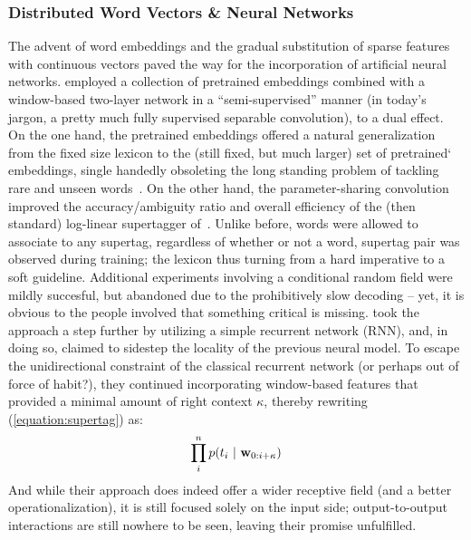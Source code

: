 \subsubsection{Distributed Word Vectors \& Neural Networks}
The advent of word embeddings and the gradual substitution of sparse features with continuous vectors paved the way for the incorporation of artificial neural networks.
\citet{10.1162/tacl_a_00186} employed a collection of pretrained embeddings combined with a window-based two-layer network in a ``semi-supervised'' manner (in today's jargon, a pretty much fully supervised separable convolution), to a dual effect.
On the one hand, the pretrained embeddings offered a natural generalization from the fixed size lexicon to the (still fixed, but much larger) set of pretrained` embeddings, single handedly obsoleting the long standing problem of tackling rare and unseen words~\cite{thomforde-steedman-2011-semi,deoskar-etal-2011-learning,deoskar2014generalizing}.
On the other hand, the parameter-sharing convolution improved the accuracy/ambiguity ratio and overall efficiency of the (then standard) log-linear supertagger of~\citet{clark2007wide}.
Unlike before, words were allowed to associate to any supertag, regardless of whether or not a \textlangle word, supertag\textrangle{} pair was observed during training; the lexicon thus turning from a hard imperative to a soft guideline.
Additional experiments involving a conditional random field were mildly succesful, but abandoned due to the prohibitively slow decoding -- yet, it is obvious to the people involved that something critical is missing.
\citet{xu-etal-2015-ccg} took the approach a step further by utilizing a simple recurrent network (RNN), and, in doing so, claimed to sidestep the locality of the previous neural model.
To escape the unidirectional constraint of the classical recurrent network (or perhaps out of force of habit?), they continued incorporating window-based features that provided a minimal amount of right context $\kappa$, thereby rewriting (\ref{equation:supertag}) as:
\begin{equation}
	\prod_i^n p(t_i \ | \ \seq{w}{0:i+\kappa})
\end{equation}
And while their approach does indeed offer a wider receptive field (and a better operationalization), it is still focused solely on the input side; output-to-output interactions are still nowhere to be seen, leaving their promise unfulfilled.

